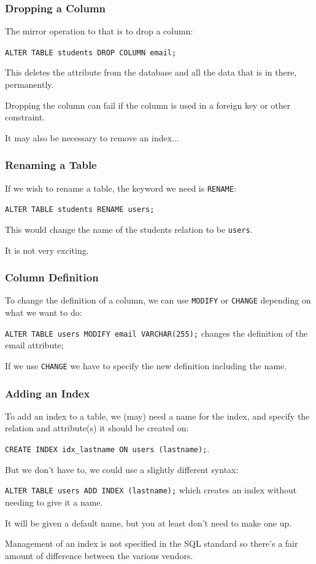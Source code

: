 \begin{frame}
\frametitle{Dropping a Column}

The mirror operation to that is to drop a column: 

\texttt{ALTER TABLE students DROP COLUMN email;} 

This deletes the attribute from the database and all the data that is in there, permanently. 

Dropping the column can fail if the column is used in a foreign key or other constraint. 

It may also be necessary to remove an index... 

\end{frame}

\begin{frame}
\frametitle{Renaming a Table}

If we wish to rename a table, the keyword we need is \texttt{RENAME}: 

\texttt{ALTER TABLE students RENAME users;} 

This would change the name of the students relation to be \texttt{users}. 

It is not very exciting.

\end{frame}

\begin{frame}
\frametitle{Column Definition}

To change the definition of a column, we can use \texttt{MODIFY} or \texttt{CHANGE} depending on what we want to do: 

\texttt{ALTER TABLE users MODIFY email VARCHAR(255);} changes the definition of the email attribute; 

If we use \texttt{CHANGE} we have to specify the new definition including the name.

\end{frame}

\begin{frame}
\frametitle{Adding an Index}

To add an index to a table, we (may) need a name for the index, and specify the relation and attribute(s) it should be created on: 

\texttt{CREATE INDEX idx\_lastname ON users (lastname);}. 

But we don't have to, we could use a slightly different syntax: 

\texttt{ALTER TABLE users ADD INDEX (lastname);} which creates an index without needing to give it a name. 

It will be given a default name, but you at least don't need to make one up. 

Management of an index is not specified in the SQL standard so there's a fair amount of difference between the various vendors.


\end{frame}

